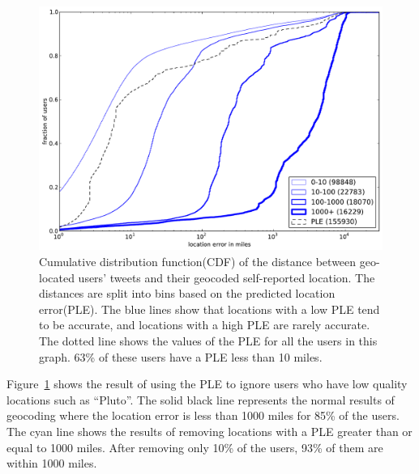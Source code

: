 \begin{figure}[tb]
\centering
\includegraphics[width=\linewidth]{figures/mloc_mdist.pdf}
\caption{
Cumulative distribution function(CDF) of the distance between geo-located
users' tweets and their geocoded self-reported location.
%
The distances are split into bins based on the predicted location error(PLE).
%
The blue lines show that locations with a low PLE tend to be accurate, and
locations with a high PLE are rarely accurate.
%
The dotted line shows the values of the PLE for all the
users in this graph.
%
63\% of these users have a PLE less than 10 miles.
}
\label{fig:DiffMlocMdist}
\end{figure}

Figure~\ref{fig:DiffMlocMdist} shows the result of using the PLE to ignore
users who have low quality locations such as ``Pluto''.
The solid black line represents the normal results of geocoding where the
location error is less than 1000 miles for 85\% of the users.
The cyan line shows the results of removing locations with a PLE greater than
or equal to 1000 miles.
After removing only 10\% of the users, 93\% of them are within 1000 miles.

